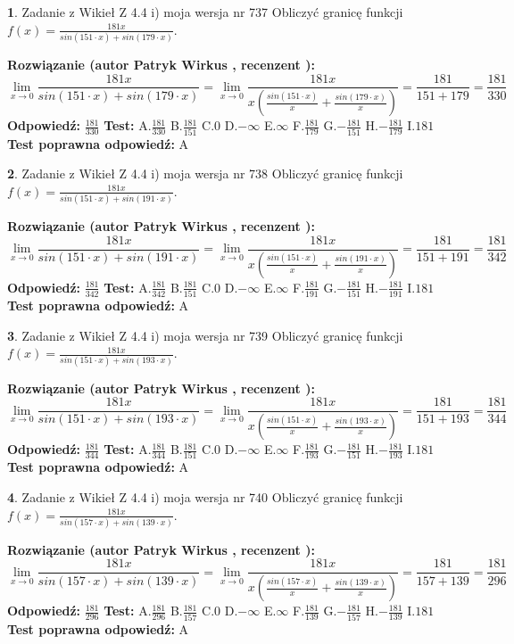 \documentclass[12pt, a4paper]{article}
\theoremstyle{definition} %
\newtheorem{zad}{}
\newcommand{\zadStart}[1]{\begin{zad}#1\newline}
\newcommand{\zadStop}{\end{zad}}
\newcommand{\rozwStart}[2]{\noindent \textbf{Rozwiązanie (autor #1 , recenzent #2): }\newline}
\newcommand{\rozwStop}{\newline}
\newcommand{\odpStart}{\noindent \textbf{Odpowiedź:}\newline}
\newcommand{\odpStop}{\newline}
\newcommand{\testStart}{\noindent \textbf{Test:}\newline}
\newcommand{\testStop}{\newline}
\newcommand{\kluczStart}{\noindent \textbf{Test poprawna odpowiedź:}\newline}
\newcommand{\kluczStop}{\newline}
\begin{document}
\zadStart{Zadanie z Wikieł Z 4.4 i) moja wersja nr 737}
Obliczyć granicę funkcji $f(x)=\frac{181x}{sin(151\cdot x) +sin(179\cdot x)}$.
\zadStop
\rozwStart{Patryk Wirkus}{}
$$\lim\limits_{x\to 0}\frac{181x}{sin(151\cdot x) +sin(179\cdot x)}=\lim\limits_{x\to 0}\frac{181x}{x(\frac{sin(151\cdot x)}{x}+\frac{sin(179\cdot x)}{x})}=\frac{181}{151+179} = \frac{181}{330}$$
\rozwStop
\odpStart
$\frac{181}{330}$
\odpStop
\testStart
A.$\frac{181}{330}$
B.$\frac{181}{151}$
C.$0$
D.$-\infty$
E.$\infty$
F.$\frac{181}{179}$
G.$-\frac{181}{151}$
H.$-\frac{181}{179}$
I.$181$
\testStop
\kluczStart
A
\kluczStop



\zadStart{Zadanie z Wikieł Z 4.4 i) moja wersja nr 738}
Obliczyć granicę funkcji $f(x)=\frac{181x}{sin(151\cdot x) +sin(191\cdot x)}$.
\zadStop
\rozwStart{Patryk Wirkus}{}
$$\lim\limits_{x\to 0}\frac{181x}{sin(151\cdot x) +sin(191\cdot x)}=\lim\limits_{x\to 0}\frac{181x}{x(\frac{sin(151\cdot x)}{x}+\frac{sin(191\cdot x)}{x})}=\frac{181}{151+191} = \frac{181}{342}$$
\rozwStop
\odpStart
$\frac{181}{342}$
\odpStop
\testStart
A.$\frac{181}{342}$
B.$\frac{181}{151}$
C.$0$
D.$-\infty$
E.$\infty$
F.$\frac{181}{191}$
G.$-\frac{181}{151}$
H.$-\frac{181}{191}$
I.$181$
\testStop
\kluczStart
A
\kluczStop



\zadStart{Zadanie z Wikieł Z 4.4 i) moja wersja nr 739}
Obliczyć granicę funkcji $f(x)=\frac{181x}{sin(151\cdot x) +sin(193\cdot x)}$.
\zadStop
\rozwStart{Patryk Wirkus}{}
$$\lim\limits_{x\to 0}\frac{181x}{sin(151\cdot x) +sin(193\cdot x)}=\lim\limits_{x\to 0}\frac{181x}{x(\frac{sin(151\cdot x)}{x}+\frac{sin(193\cdot x)}{x})}=\frac{181}{151+193} = \frac{181}{344}$$
\rozwStop
\odpStart
$\frac{181}{344}$
\odpStop
\testStart
A.$\frac{181}{344}$
B.$\frac{181}{151}$
C.$0$
D.$-\infty$
E.$\infty$
F.$\frac{181}{193}$
G.$-\frac{181}{151}$
H.$-\frac{181}{193}$
I.$181$
\testStop
\kluczStart
A
\kluczStop



\zadStart{Zadanie z Wikieł Z 4.4 i) moja wersja nr 740}
Obliczyć granicę funkcji $f(x)=\frac{181x}{sin(157\cdot x) +sin(139\cdot x)}$.
\zadStop
\rozwStart{Patryk Wirkus}{}
$$\lim\limits_{x\to 0}\frac{181x}{sin(157\cdot x) +sin(139\cdot x)}=\lim\limits_{x\to 0}\frac{181x}{x(\frac{sin(157\cdot x)}{x}+\frac{sin(139\cdot x)}{x})}=\frac{181}{157+139} = \frac{181}{296}$$
\rozwStop
\odpStart
$\frac{181}{296}$
\odpStop
\testStart
A.$\frac{181}{296}$
B.$\frac{181}{157}$
C.$0$
D.$-\infty$
E.$\infty$
F.$\frac{181}{139}$
G.$-\frac{181}{157}$
H.$-\frac{181}{139}$
I.$181$
\testStop
\kluczStart
A
\kluczStop
\end{document}
